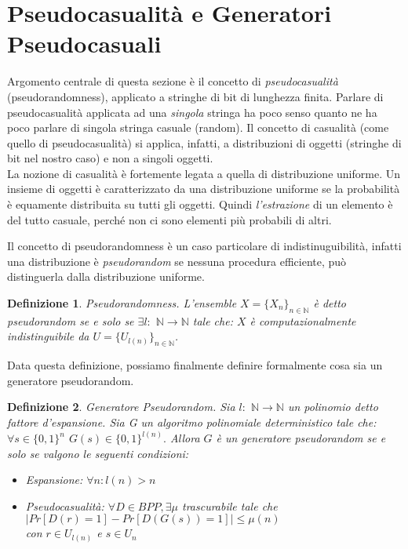 \documentclass[a4paper,openright,twoside,12pt]{report}
\newtheorem{definizione}{Definizione}[chapter]
\begin{document}
\section{Pseudocasualit\`a e Generatori Pseudocasuali}
Argomento centrale di questa sezione \`e il concetto di \emph{pseudocasualit\`a} (pseudorandomness), applicato a stringhe di bit di lunghezza finita.
Parlare di pseudocasualit\`a applicata ad una \emph{singola} stringa ha poco senso quanto ne ha poco parlare di singola stringa casuale (random).
Il concetto di casualit\`a (come quello di pseudocasualit\`a) si applica, infatti, a distribuzioni di oggetti (stringhe di bit nel nostro caso) e non a singoli oggetti.\\
La nozione di casualit\`a \`e fortemente legata a quella di distribuzione uniforme. Un insieme di oggetti \`e caratterizzato
da una distribuzione uniforme se la probabilit\`a \`e equamente distribuita su tutti gli oggetti. Quindi \emph{l'estrazione} di un elemento \`e del tutto casuale, 
perch\'e non ci sono elementi pi\`u probabili di altri.

Il concetto di pseudorandomness \`e un caso particolare di indistinuguibilit\`a, infatti una distribuzione \`e \emph{pseudorandom} se nessuna procedura efficiente, 
pu\`o distinguerla dalla distribuzione uniforme.
\begin{definizione}{Pseudorandomness.}
L'ensemble $X=\{X_n\}_{n \in \mathbb{N}}$ \`e detto pseudorandom se e solo se $ \exists l:$ $\mathbb{N}\rightarrow\mathbb{N}$ tale che: 
$X$ \`e computazionalmente indistinguibile da $U=\{U_{l(n)}\}_{n \in \mathbb{N}} $.  
\end{definizione}
Data questa definizione, possiamo finalmente definire formalmente cosa sia un generatore pseudorandom.
\begin{definizione}{Generatore Pseudorandom.}
Sia $l:$ $\mathbb{N}\rightarrow\mathbb{N}$ un polinomio detto fattore d'espansione. 
Sia G un algoritmo polinomiale deterministico tale che: $\forall s \in \{0, 1\}^{n}$ $G(s) \in \{0, 1\}^{l(n)}.$
Allora $G$ \`e un generatore pseudorandom se e solo se valgono le seguenti condizioni:
\begin{itemize}
 \item Espansione: $\forall n: l(n) > n$
 \item Pseudocasualit\`a: $\forall D \in BPP, \exists \mu$ trascurabile tale che \\$\lvert Pr[D(r) = 1] - Pr[D(G(s)) = 1] \rvert \leq \mu(n)$\\con $r \in U_{l(n)}$ e 
$s \in U_{n}$
\end{itemize}
\end{definizione}
\end{document}
